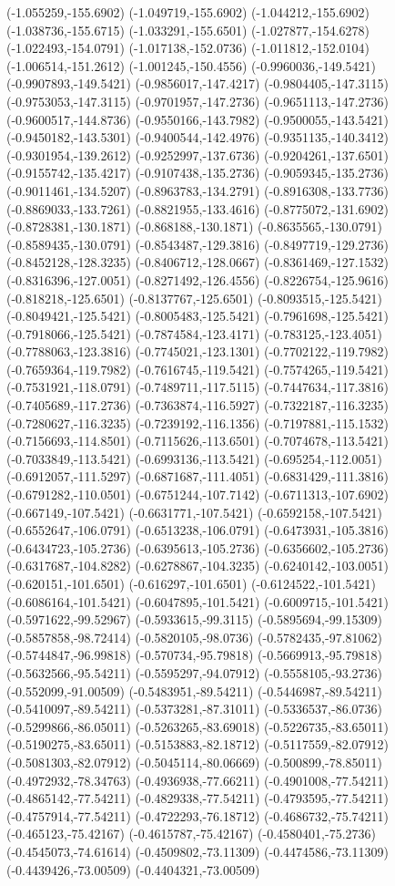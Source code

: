 \documentclass[12pt,letterpaper]{article}
\begin{document}
(-1.055259,-155.6902) (-1.049719,-155.6902) (-1.044212,-155.6902) (-1.038736,-155.6715) (-1.033291,-155.6501) (-1.027877,-154.6278) (-1.022493,-154.0791) (-1.017138,-152.0736) (-1.011812,-152.0104) (-1.006514,-151.2612) (-1.001245,-150.4556) (-0.9960036,-149.5421) (-0.9907893,-149.5421) (-0.9856017,-147.4217) (-0.9804405,-147.3115) (-0.9753053,-147.3115) (-0.9701957,-147.2736) (-0.9651113,-147.2736) (-0.9600517,-144.8736) (-0.9550166,-143.7982) (-0.9500055,-143.5421) (-0.9450182,-143.5301) (-0.9400544,-142.4976) (-0.9351135,-140.3412) (-0.9301954,-139.2612) (-0.9252997,-137.6736) (-0.9204261,-137.6501) (-0.9155742,-135.4217) (-0.9107438,-135.2736) (-0.9059345,-135.2736) (-0.9011461,-134.5207) (-0.8963783,-134.2791) (-0.8916308,-133.7736) (-0.8869033,-133.7261) (-0.8821955,-133.4616) (-0.8775072,-131.6902) (-0.8728381,-130.1871) (-0.868188,-130.1871) (-0.8635565,-130.0791) (-0.8589435,-130.0791) (-0.8543487,-129.3816) (-0.8497719,-129.2736) (-0.8452128,-128.3235) (-0.8406712,-128.0667) (-0.8361469,-127.1532) (-0.8316396,-127.0051) (-0.8271492,-126.4556) (-0.8226754,-125.9616) (-0.818218,-125.6501) (-0.8137767,-125.6501) (-0.8093515,-125.5421) (-0.8049421,-125.5421) (-0.8005483,-125.5421) (-0.7961698,-125.5421) (-0.7918066,-125.5421) (-0.7874584,-123.4171) (-0.783125,-123.4051) (-0.7788063,-123.3816) (-0.7745021,-123.1301) (-0.7702122,-119.7982) (-0.7659364,-119.7982) (-0.7616745,-119.5421) (-0.7574265,-119.5421) (-0.7531921,-118.0791) (-0.7489711,-117.5115) (-0.7447634,-117.3816) (-0.7405689,-117.2736) (-0.7363874,-116.5927) (-0.7322187,-116.3235) (-0.7280627,-116.3235) (-0.7239192,-116.1356) (-0.7197881,-115.1532) (-0.7156693,-114.8501) (-0.7115626,-113.6501) (-0.7074678,-113.5421) (-0.7033849,-113.5421) (-0.6993136,-113.5421) (-0.695254,-112.0051) (-0.6912057,-111.5297) (-0.6871687,-111.4051) (-0.6831429,-111.3816) (-0.6791282,-110.0501) (-0.6751244,-107.7142) (-0.6711313,-107.6902) (-0.667149,-107.5421) (-0.6631771,-107.5421) (-0.6592158,-107.5421) (-0.6552647,-106.0791) (-0.6513238,-106.0791) (-0.6473931,-105.3816) (-0.6434723,-105.2736) (-0.6395613,-105.2736) (-0.6356602,-105.2736) (-0.6317687,-104.8282) (-0.6278867,-104.3235) (-0.6240142,-103.0051) (-0.620151,-101.6501) (-0.616297,-101.6501) (-0.6124522,-101.5421) (-0.6086164,-101.5421) (-0.6047895,-101.5421) (-0.6009715,-101.5421) (-0.5971622,-99.52967) (-0.5933615,-99.3115) (-0.5895694,-99.15309) (-0.5857858,-98.72414) (-0.5820105,-98.0736) (-0.5782435,-97.81062) (-0.5744847,-96.99818) (-0.570734,-95.79818) (-0.5669913,-95.79818) (-0.5632566,-95.54211) (-0.5595297,-94.07912) (-0.5558105,-93.2736) (-0.552099,-91.00509) (-0.5483951,-89.54211) (-0.5446987,-89.54211) (-0.5410097,-89.54211) (-0.5373281,-87.31011) (-0.5336537,-86.0736) (-0.5299866,-86.05011) (-0.5263265,-83.69018) (-0.5226735,-83.65011) (-0.5190275,-83.65011) (-0.5153883,-82.18712) (-0.5117559,-82.07912) (-0.5081303,-82.07912) (-0.5045114,-80.06669) (-0.500899,-78.85011) (-0.4972932,-78.34763) (-0.4936938,-77.66211) (-0.4901008,-77.54211) (-0.4865142,-77.54211) (-0.4829338,-77.54211) (-0.4793595,-77.54211) (-0.4757914,-77.54211) (-0.4722293,-76.18712) (-0.4686732,-75.74211) (-0.465123,-75.42167) (-0.4615787,-75.42167) (-0.4580401,-75.2736) (-0.4545073,-74.61614) (-0.4509802,-73.11309) (-0.4474586,-73.11309) (-0.4439426,-73.00509) (-0.4404321,-73.00509) 
\end{document}
